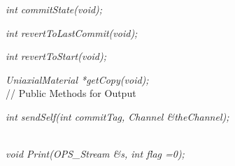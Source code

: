 {\em int commitState(void); } 

{\em int revertToLastCommit(void); } 

{\em int revertToStart(void); } 

{\em UniaxialMaterial *getCopy(void); } \\ 

// Public Methods for Output

{\em    int sendSelf(int commitTag, Channel \&theChannel); }

\\
{\em    void Print(OPS_Stream \&s, int flag =0);} 



